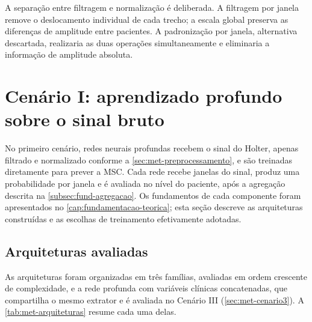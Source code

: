 A separação entre filtragem e normalização é deliberada. A filtragem por
janela remove o deslocamento individual de cada trecho; a escala global
preserva as diferenças de amplitude entre pacientes. A padronização por
janela, alternativa descartada, realizaria as duas operações
simultaneamente e eliminaria a informação de amplitude absoluta.



\section{Cenário I: aprendizado profundo sobre o sinal bruto}
\label{sec:met-cenario1}
\label{sec:met-redes}

No primeiro cenário, redes neurais profundas recebem o sinal do Holter,
apenas filtrado e normalizado conforme a \autoref{sec:met-preprocessamento},
e são treinadas diretamente para prever a \gls{MSC}. Cada rede recebe janelas
do sinal, produz uma probabilidade por janela e é avaliada no nível do
paciente, após a agregação descrita na \autoref{subsec:fund-agregacao}. Os
fundamentos de cada componente foram apresentados no
\autoref{cap:fundamentacao-teorica}; esta seção descreve as arquiteturas
construídas e as escolhas de treinamento efetivamente adotadas.


\subsection{Arquiteturas avaliadas}
\label{subsec:met-arquiteturas}

As arquiteturas foram organizadas em três famílias, avaliadas em ordem
crescente de complexidade, e a rede profunda com variáveis clínicas concatenadas, que
compartilha o mesmo extrator e é avaliada no Cenário III
(\autoref{sec:met-cenario3}). A \autoref{tab:met-arquiteturas} resume cada uma
delas.

